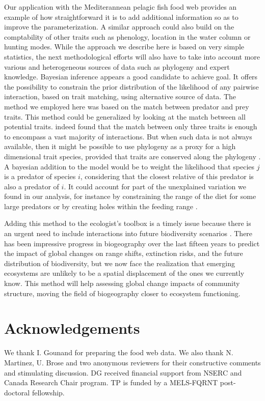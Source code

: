 \documentclass[12pt]{article}
\begin{document}
Our application with the Mediterannean pelagic fish food web provides an example
of how straightforward it is to add additional information so as to improve the
parameterization. A similar approach could also build on the comptability of
other traits such as phenology, location in the water column or hunting modes.
While the approach we describe here is based on very simple statistics, the next
methodological efforts will also have to take into account more various and
heterogeneous sources of data such as phylogeny \parencite{Eklof2012} and expert
knowledge. Bayesian inference appears a good candidate to achieve goal. It
offers the possibility to constrain the prior distribution of the likelihood of
any pairwise interaction, based on trait matching, using alternative source of
data. The method we employed here was based on the match between predator and
prey traits. This method could be generalized by looking at the match between
all potential traits. \textcite{Eklof2013} indeed found that the match between
only three traits is enough to encompass a vast majority of interactions. But
when such data is not always available, then it might be possible to use
phylogeny as a proxy for a high dimensional trait species, provided that traits
are conserved along the phylogeny \parencite{Mouquet2012}. A bayesian addition
to the model would be to weight the likelihood that species $j$ is a predator of
species $i$, considering that the closest relative of this predator is also a
predator of $i$. It could account for part of the unexplained variation we found
in our analysis, for instance by constraining the range of the diet for some
large predators or by creating holes within the feeding range
\parencite{Rall2011}.

Adding this method to the ecologist's toolbox is a timely issue because there is
an urgent need to include interactions into future biodiversity scenarios
\parencite{Thuiller2013}. There has been impressive progress in biogeography
over the last fifteen years to predict the impact of global changes on range
shifts, extinction risks, and the future distribution of biodiversity, but we
now face the realization that emerging ecosystems are unlikely to be a spatial
displacement of the ones we currently know. This method will help assessing
global change impacts of community structure, moving the field of biogeography
closer to ecosystem functioning.

\section{Acknowledgements}
We thank I. Gounand for preparing the food web data. We also thank N. Martinez,
U. Brose and two anonymous reviewers for their constructive comments and
stimulating discussion. DG received financial support from NSERC and Canada
Research Chair program. TP is funded by a MELS-FQRNT post-doctoral fellowship.
\newpage
\end{document}
